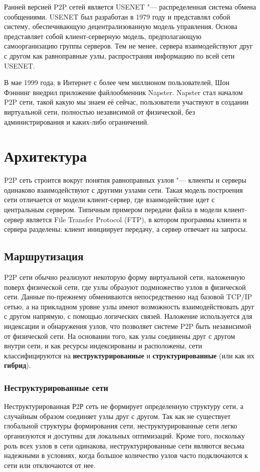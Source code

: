 \documentclass[bachelor, och, coursework]{SCWorks}
\begin{document}
Ранней версией P2P сетей является USENET "--- распределенная система обмена сообщениями. USENET был разработан в 1979 году и представлял собой систему, обеспечивающую децентрализованную модель управления. Основа представляет собой клиент-серверную модель, предполагающую самоорганизацию группы серверов. Тем не менее, сервера взаимодействуют друг с другом как равноправные узлы, распространяя информацию по всей сети USENET.

В мае 1999 года, в Интернет с более чем миллионом пользователей, Шон Фэннинг внедрил приложение файлообменник Napster. Napster стал началом P2P сети, такой какую мы знаем её сейчас, пользователи участвуют в создании виртуальной сети, полностью независимой от физической, без администрирования и каких-либо ограничений.

\section{Архитектура}
P2P сеть строится вокруг понятия равноправных узлов "--- клиенты и серверы одинаково взаимодействуют с другими узлами сети. Такая модель построения сети отличается от модели клиент-сервер, где взаимодействие идет с центральным сервером. Типичным примером передачи файла в модели клиент-сервер является File Transfer Protocol (FTP), в котором программы клиента и сервера разделены: клиент инициирует передачу, а сервер отвечает на запросы.

\subsection{Маршрутизация}
P2P сети обычно реализуют некоторую форму виртуальной сети, наложенную поверх физической сети, где узлы образуют подмножество узлов в физической сети. Данные по-прежнему обмениваются непосредственно над базовой TCP/IP сетью, а на прикладном уровне узлы имеют возможность взаимодействовать друг с другом напрямую, с помощью логических связей. Наложение используется для индексации и обнаружения узлов, что позволяет системе P2P быть независимой от физической сети. На основании того, как узлы соединены друг с другом внутри сети, и как ресурсы индексированы и расположены, сети классифицируются на \textbf{неструктурированные} и \textbf{структурированные} (или как их \textbf{гибрид}).

\subsubsection{Неструктурированные сети}
Неструктурированная Р2Р сеть не формирует определенную структуру сети, а случайным образом соединяет узлы друг с другом. Так как не существует глобальной структуры формирования сети, неструктурированные сети легко организуются и доступны для локальных оптимизаций. Кроме того, поскольку роль всех узлов в сети одинакова, неструктурированные сети являются весьма надежными в условиях, когда большое количество узлов часто подключаются к сети или отключаются от нее.
\end{document}

